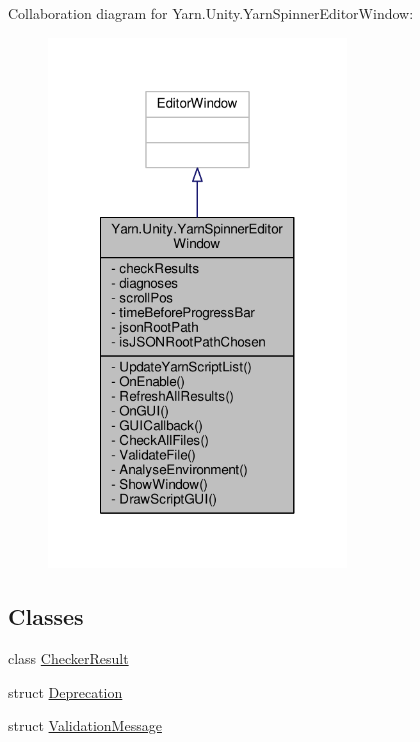 Collaboration diagram for Yarn.\-Unity.\-Yarn\-Spinner\-Editor\-Window\-:
\nopagebreak
\begin{figure}[H]
\begin{center}
\leavevmode
\includegraphics[width=224pt]{a00702}
\end{center}
\end{figure}
\subsection*{Classes}
\begin{DoxyCompactItemize}
\item 
class \hyperlink{a00049}{Checker\-Result}
\item 
struct \hyperlink{a00088}{Deprecation}
\item 
struct \hyperlink{a00166_a00358}{Validation\-Message}
\end{DoxyCompactItemize}
